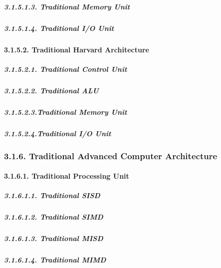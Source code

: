 \documentclass[
]{article}
\begin{document}
\hypertarget{traditional-memory-unit-2}{%
\subparagraph{3.1.5.1.3. Traditional Memory
Unit}\label{traditional-memory-unit-2}}

\hypertarget{traditional-io-unit-2}{%
\subparagraph{3.1.5.1.4. Traditional I/O
Unit}\label{traditional-io-unit-2}}

\hypertarget{traditional-harvard-architecture-1}{%
\paragraph{3.1.5.2. Traditional Harvard
Architecture}\label{traditional-harvard-architecture-1}}

\hypertarget{traditional-control-unit-3}{%
\subparagraph{3.1.5.2.1. Traditional Control
Unit}\label{traditional-control-unit-3}}

\hypertarget{traditional-alu-3}{%
\subparagraph{3.1.5.2.2. Traditional ALU}\label{traditional-alu-3}}

\hypertarget{traditional-memory-unit-3}{%
\subparagraph{3.1.5.2.3.Traditional Memory
Unit}\label{traditional-memory-unit-3}}

\hypertarget{traditional-io-unit-3}{%
\subparagraph{3.1.5.2.4.Traditional I/O
Unit}\label{traditional-io-unit-3}}

\hypertarget{traditional-advanced-computer-architecture-1}{%
\subsubsection{3.1.6. Traditional Advanced Computer
Architecture}\label{traditional-advanced-computer-architecture-1}}

\hypertarget{traditional-processing-unit-1}{%
\paragraph{3.1.6.1. Traditional Processing
Unit}\label{traditional-processing-unit-1}}

\hypertarget{traditional-sisd-1}{%
\subparagraph{3.1.6.1.1. Traditional SISD}\label{traditional-sisd-1}}

\hypertarget{traditional-simd-1}{%
\subparagraph{3.1.6.1.2. Traditional SIMD}\label{traditional-simd-1}}

\hypertarget{traditional-misd-1}{%
\subparagraph{3.1.6.1.3. Traditional MISD}\label{traditional-misd-1}}

\hypertarget{traditional-mimd-1}{%
\subparagraph{3.1.6.1.4. Traditional MIMD}\label{traditional-mimd-1}}
\end{document}
